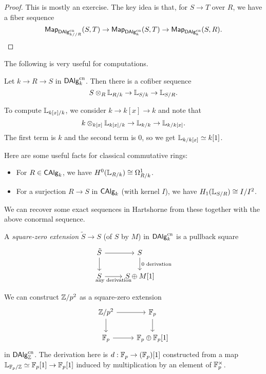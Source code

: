 \documentclass{amsart}
\begin{document}
\begin{proof}
	This is mostly an exercise.
	The key idea is that, for $S \to T$ over $R$, we have a fiber sequence
	\[
		\mathsf{Map}_{\mathsf{DAlg}_{k//R}^{\mathrm{cn}}}(S, T) \to \mathsf{Map}_{\mathsf{DAlg}_k^{\mathrm{cn}}}(S, T) \to \mathsf{Map}_{\mathsf{DAlg}_k^{\mathrm{cn}}}(S, R). \qedhere
	\]
\end{proof}

The following is very useful for computations.

\begin{exer}
	Let $k \to R \to S$ in $\mathsf{DAlg}_k^{\mathrm{cn}}$.
	Then there is a cofiber sequence
	\[
		S \otimes_R \mathbb{L}_{R/k} \to \mathbb{L}_{S/k} \to \mathbb{L}_{S/R}.
	\]
\end{exer}

\begin{ex}
	To compute $\mathbb{L}_{k[x]/k}$, we consider $k \to k[x] \to k$ and note that
	\[
		k \otimes_{k[x]} \mathbb{L}_{k[x]/k} \to \mathbb{L}_{k/k} \to \mathbb{L}_{k/k[x]}.
	\]
	The first term is $k$ and the second term is $0$, so we get $\mathbb{L}_{k/k[x]} \simeq k[1]$.
\end{ex}

Here are some useful facts for classical commutative rings:
\begin{itemize}
	\item For $R \in \mathsf{CAlg}_k$, we have $H^0(\mathbb{L}_{R/k}) \cong \Omega^1_{R/k}$.
	\item For a surjection $R \to S$ in $\mathsf{CAlg}_k$ (with kernel $I$), we have $H_1(\mathbb{L}_{S/R}) \cong I / I^2$.
\end{itemize}
We can recover some exact sequences in Hartshorne from these together with the above conormal sequence.

\begin{dfn}
	A \emph{square-zero extension} $\tilde{S} \to S$ (of $S$ by $M$) in $\mathsf{DAlg}_k^{\mathrm{cn}}$ is a pullback square
	\[
		\begin{tikzcd}
			\tilde{S} \rar \dar & S \dar["0 \textrm{ derivation}"] \\
			S \rar[swap, "\textrm{any derivation}"] & S \oplus M[1]
		\end{tikzcd}
	\]
\end{dfn}

\begin{ex}
	We can construct $\mathbb{Z} / p^2$ as a square-zero extension
	\[
		\begin{tikzcd}
			\ZZ / p^2 \rar \dar & \FF_p \dar \\
			\FF_p \rar & \FF_p \oplus \FF_p [1]
		\end{tikzcd}
	\]
	in $\mathsf{DAlg}_{\mathbb{Z}}^{\mathrm{cn}}$.
	The derivation here is $d: \mathbb{F}_p \to (\mathbb{F}_p)[1]$ constructed from a map $\mathbb{L}_{\mathbb{F}_p/\mathbb{Z}} \simeq \mathbb{F}_p[1] \to \mathbb{F}_p[1]$ induced by multiplication by an element of $\mathbb{F}_p^\times$.
\end{ex}
\end{document}
